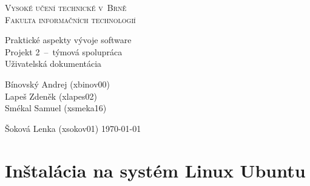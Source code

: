 \documentclass[11pt, a4paper]{article}
\author{Andrej Bínovský\\ \url{xbinov00@fit.vutbr.cz} }
\begin{document}
	\begin{titlepage}
		\begin{center}
			\Huge
			\textsc{Vysoké učení technické v~Brně}\\
			\huge\textsc{Fakulta informačních technologií}\\
			
				
            \Huge{Praktické aspekty vývoje software\\}
				\huge{Projekt 2 \,--\, týmová spolupráca\\
                        Uživatelská dokumentácia}
						
		
		\end{center}
        \begin{flushleft}
            \Large{ Bínovský Andrej (xbinov00)}\\
            \Large{Lapeš Zdeněk (xlapes02)}\\
            \Large{Smékal Samuel (xsmeka16)}
        \end{flushleft}
        \vspace{-4mm}
        \Large{Šoková Lenka (xsokov01)}
        \hfill\Large{\today}
	\end{titlepage}
    
    \section*{Inštalácia na systém Linux Ubuntu}
    
\end{document}
